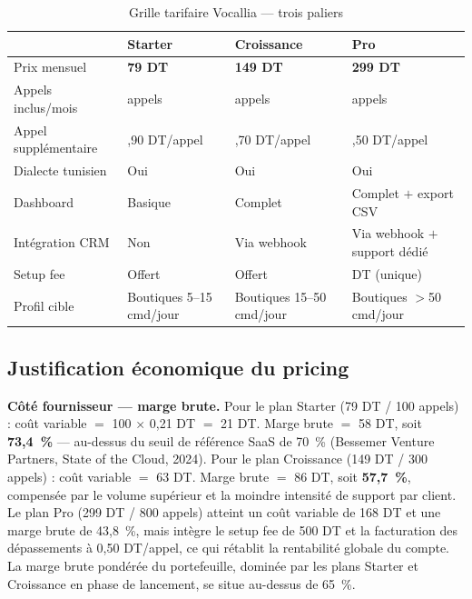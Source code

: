 \begin{table}[H]
\centering
\caption{Grille tarifaire Vocallia --- trois paliers}
\vspace{4pt}
\begin{tabularx}{\textwidth}{|>{\raggedright\arraybackslash}p{3.2cm}|>{\raggedright\arraybackslash}X|>{\raggedright\arraybackslash}X|>{\raggedright\arraybackslash}X|}
\hline
& \textbf{Starter} & \textbf{Croissance} & \textbf{Pro} \\
\hline
Prix mensuel & \textbf{79 DT} & \textbf{149 DT} & \textbf{299 DT} \\
\hline
Appels inclus/mois & 100 appels & 300 appels & 800 appels \\
\hline
Appel supplémentaire & 0,90 DT/appel & 0,70 DT/appel & 0,50 DT/appel \\
\hline
Dialecte tunisien & Oui & Oui & Oui \\
\hline
Dashboard & Basique & Complet & Complet $+$ export CSV \\
\hline
Intégration CRM & Non & Via webhook & Via webhook $+$ support dédié \\
\hline
Setup fee & Offert & Offert & 500 DT (unique) \\
\hline
Profil cible & Boutiques 5--15 cmd/jour & Boutiques 15--50 cmd/jour & Boutiques $>$50 cmd/jour \\
\hline
\end{tabularx}
\end{table}


\subsection{Justification économique du pricing}
\label{section3.8.2}

\noindent\textbf{Côté fournisseur --- marge brute.} Pour le plan Starter (79 DT / 100 appels) : coût variable $=$ 100 $\times$ 0,21 DT $=$ 21 DT. Marge brute $=$ 58 DT, soit \textbf{73,4~\%} --- au-dessus du seuil de référence SaaS de 70~\% (Bessemer Venture Partners, State of the Cloud, 2024). Pour le plan Croissance (149 DT / 300 appels) : coût variable $=$ 63 DT. Marge brute $=$ 86 DT, soit \textbf{57,7~\%}, compensée par le volume supérieur et la moindre intensité de support par client. Le plan Pro (299 DT / 800 appels) atteint un coût variable de 168 DT et une marge brute de 43,8~\%, mais intègre le setup fee de 500 DT et la facturation des dépassements à 0,50 DT/appel, ce qui rétablit la rentabilité globale du compte. La marge brute pondérée du portefeuille, dominée par les plans Starter et Croissance en phase de lancement, se situe au-dessus de 65~\%.

